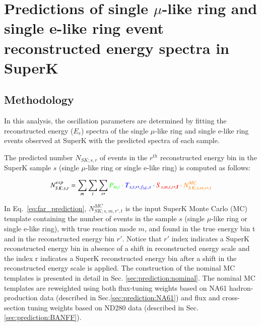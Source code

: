 

\section{Predictions of single $\mu$-like ring and single e-like ring event reconstructed energy spectra in SuperK}
\label{sec:prediction}

\subsection{Methodology}
\label{sec:prediction:methodology}

In this analysis, the oscillation parameters are determined by fitting the reconstructed energy ($E_{r}$) spectra of the single $\mu$-like ring and single e-like ring events observed at SuperK with the predicted spectra of each sample.

The predicted number $N_{SK;s,r}$
of events
in the $r^{th}$ reconstructed energy bin
in the SuperK sample $s$ (single $\mu$-like ring or single e-like ring)
is computed as follows:

\begin{equation}
\displaystyle
  N^{exp}_{SK;s,r} =
    \sum_{m} \sum_{t} \sum_{r\prime}
        \color{green}{P_{m,t}} \cdot
        \color{blue}{T_{s,r,r\prime,f_{{\Delta}E},s}} \cdot
        \color{red}{S_{s,m,t,r\prime,\textbf{f}}} \cdot
        \color{orange}{N_{SK;s,m,r\prime,t}^{MC}} 
\label{eq:far_prediction}
\end{equation}

In Eq.\ \ref{eq:far_prediction}, $N_{SK;s,m,r\prime,t}^{MC}$ is the input SuperK Monte Carlo (MC) template
containing the number of events in the sample $s$ (single $\mu$-like ring or single e-like ring), with true reaction mode $m$,
and found in the true energy bin t and in the reconstructed energy bin $r\prime$.
Notice that $r\prime$ index indicates a SuperK reconstructed energy bin in absence of a shift in
reconstructed energy scale and the index r indicates a SuperK reconstructed energy bin after a shift in the
reconstructed energy scale is applied.
The construction of the nominal MC templates is presented in detail in 
Sec. \ref{sec:prediction:nominal}.
The nominal MC templates are reweighted using both
flux-tuning weights based on NA61 hadron-production data (described in Sec.\ref{sec:prediction:NA61})
and flux and cross-section tuning weights based on ND280 data (described in Sec.\ref{sec:prediction:BANFF}).


